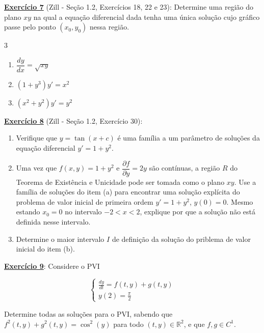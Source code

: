 \documentclass[oneside,12pt,a4paper]{report}
\begin{document}
    \noindent\textbf{\hyperlink{resp:ex7}{\hypertarget{quest:ex7}{Exercício 7}}} (Zill - Seção 1.2, Exercícios 18, 22 e 23): Determine uma região do plano $xy$ na qual a equação diferencial dada tenha uma única solução cujo gráfico passe pelo ponto $(x_0,y_0)$ nessa região.
    \begin{multicols}{3}
        \begin{enumerate}[label=\alph*)]
            \item $\dfrac{dy}{dx}=\sqrt{xy}$
            \item $(1+y^3)y'=x^2$
            \item $(x^2+y^2)y'=y^2$
        \end{enumerate}
    \end{multicols}
    \vspace{0.5cm}

    \noindent\textbf{\hyperlink{resp:ex8}{\hypertarget{quest:ex8}{Exercício 8}}} (Zill - Seção 1.2, Exercício 30): 
    \begin{enumerate}[label=\alph*)]
        \item Verifique que $y=\tan(x+c)$ é uma família a um parâmetro de soluções da equação diferencial $y'=1+y^2$.
        \item Uma vez que $f(x,y)=1+y^2$ e $\dfrac{\partial f}{\partial y}=2y$ são contínuas, a região $R$ do Teorema de Existência e Unicidade pode ser tomada como o plano $xy$. Use a família de soluções do item (a) para encontrar uma solução explícita do problema de valor inicial de primeira ordem $y'=1+y^2$, $y(0)=0$. Mesmo estando $x_0=0$ no intervalo $-2<x<2$, explique por que a solução não está definida nesse intervalo.
        \item Determine o maior intervalo $I$ de definição da solução do priblema de valor inicial do item (b).
    \end{enumerate}
    \vspace{0.5cm}

    \noindent\textbf{\hyperlink{resp:ex9}{\hypertarget{quest:ex9}{Exercício 9}}}: Considere o PVI

    \[
    \begin{cases} 
    \frac{dy}{dt} = f(t,y) + g(t,y) \\ 
    y(2) = \frac{\pi}{2}
    \end{cases}
    \]

    \noindent Determine todas as soluções para o PVI, sabendo que $f^2(t,y) + g^2(t,y) = \cos^2(y)$ para todo $(t,y) \in \mathbb{R}^2$, e que $f, g \in C^1$.
    \vspace{0.5cm}
\end{document}
